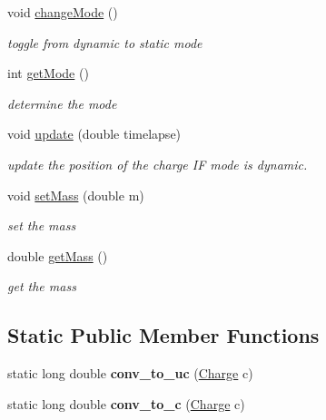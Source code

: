 \begin{DoxyCompactItemize}
void \hyperlink{classCharge_a22dc5f6bf6a12f9844bc138bc7594274}{change\-Mode} ()
\begin{DoxyCompactList}\small\item\em toggle from dynamic to static mode \end{DoxyCompactList}\item 
int \hyperlink{classCharge_aaa1409d55f9ad7a8f0d113e6185a14d4}{get\-Mode} ()
\begin{DoxyCompactList}\small\item\em determine the mode \end{DoxyCompactList}\item 
void \hyperlink{classCharge_a81b5dbb62010a3335aeeab666c492fd0}{update} (double timelapse)
\begin{DoxyCompactList}\small\item\em update the position of the charge I\-F mode is dynamic. \end{DoxyCompactList}\item 
void \hyperlink{classCharge_a5d17afa151eb8f15457a470dd75490b3}{set\-Mass} (double m)
\begin{DoxyCompactList}\small\item\em set the mass \end{DoxyCompactList}\item 
double \hyperlink{classCharge_ac6c4c42e0a2771753c02a83a8db311c7}{get\-Mass} ()
\begin{DoxyCompactList}\small\item\em get the mass \end{DoxyCompactList}\end{DoxyCompactItemize}
\subsection*{Static Public Member Functions}
\begin{DoxyCompactItemize}
\item 
\hypertarget{classCharge_ac20ca5d7269e014873b2013fabef6fb8}{static long double {\bfseries conv\-\_\-to\-\_\-uc} (\hyperlink{classCharge}{Charge} c)}\label{classCharge_ac20ca5d7269e014873b2013fabef6fb8}

\item 
\hypertarget{classCharge_a3154112873e4a5ba0959c9c973d9c7a2}{static long double {\bfseries conv\-\_\-to\-\_\-c} (\hyperlink{classCharge}{Charge} c)}\label{classCharge_a3154112873e4a5ba0959c9c973d9c7a2}

\end{DoxyCompactItemize}
